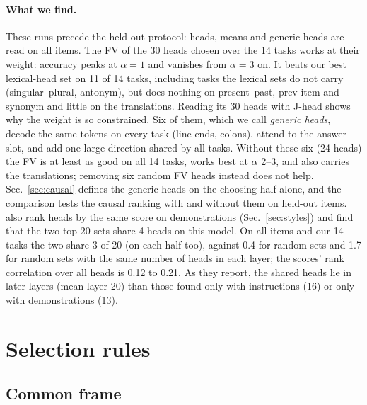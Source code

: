 \documentclass[10pt,a4paper]{article}
\begin{document}
\paragraph{What we find.} These runs precede the held-out protocol: heads, means and generic heads are read on all items. The FV of the 30 heads chosen over the 14 tasks works at their weight: accuracy peaks at $\alpha=1$ and vanishes from $\alpha=3$ on. It beats our best lexical-head set on 11 of 14 tasks, including tasks the lexical sets do not carry (singular--plural, antonym), but does nothing on present--past, prev-item and synonym and little on the translations. Reading its 30 heads with J-head shows why the weight is so constrained. Six of them, which we call \emph{generic heads}, decode the same tokens on every task (line ends, colons), attend to the answer slot, and add one large direction shared by all tasks. Without these six (24 heads) the FV is at least as good on all 14 tasks, works best at $\alpha$ 2--3, and also carries the translations; removing six random FV heads instead does not help. Sec.~\ref{sec:causal} defines the generic heads on the choosing half alone, and the comparison tests the causal ranking with and without them on held-out items. \citet{davidson2025different} also rank heads by the same score on demonstrations (Sec.~\ref{sec:styles}) and find that the two top-20 sets share 4 heads on this model. On all items and our 14 tasks the two share 3 of 20 (on each half too), against 0.4 for random sets and 1.7 for random sets with the same number of heads in each layer; the scores' rank correlation over all heads is 0.12 to 0.21. As they report, the shared heads lie in later layers (mean layer 20) than those found only with instructions (16) or only with demonstrations (13).

\section{Selection rules}\label{sec:approaches}

\subsection{Common frame}
\end{document}
